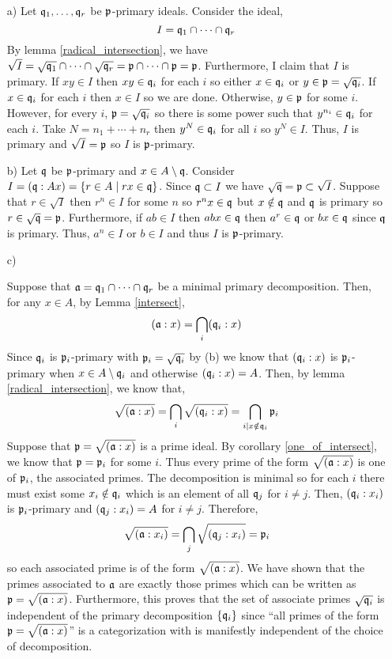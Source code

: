 \documentclass[12pt]{extarticle}
\begin{document}
\begin{enumerate}
\item[a)]
Let $\mathfrak{q}_1, \dots, \mathfrak{q}_r$ be $\mathfrak{p}$-primary ideals. Consider the ideal,
\[ I = \mathfrak{q}_1 \cap \cdots \cap \mathfrak{q}_r \]
By lemma \ref{radical_intersection}, we have $\sqrt{I} = \sqrt{\mathfrak{q}_1} \cap \cdots \cap \sqrt{\mathfrak{q}_r} = \mathfrak{p} \cap \cdots \cap \mathfrak{p} = \mathfrak{p}$. Furthermore, I claim that $I$ is primary. If $xy \in I$ then $xy \in \mathfrak{q}_i$ for each $i$ so either $x \in \mathfrak{q}_i$ or $y \in \mathfrak{p} = \sqrt{\mathfrak{q}_i}$. If $x \in \mathfrak{q}_i$ for each $i$ then $x \in I$ so we are done. Otherwise, $y \in \mathfrak{p}$ for some $i$. However, for every $i$, $\mathfrak{p} = \sqrt{\mathfrak{q}_i}$ so there is some power such that $y^{n_i} \in \mathfrak{q}_i$ for each $i$. Take $N = n_1 + \cdots + n_r$ then $y^{N} \in \mathfrak{q}_i$ for all $i$ so $y^{N} \in I$. Thus, $I$ is primary and $\sqrt{I} = \mathfrak{p}$ so $I$ is $\mathfrak{p}$-primary.
\item[b)]
Let $\mathfrak{q}$ be $\mathfrak{p}$-primary and $x \in A \setminus \mathfrak{q}$. Consider $I = (\mathfrak{q} : Ax) = \{r \in A \mid rx \in \mathfrak{q} \}$. Since $\mathfrak{q} \subset I$ we have $\sqrt{\mathfrak{q}} = \mathfrak{p} \subset \sqrt{I}$. Suppose that $r \in \sqrt{I}$ then $r^n \in I$ for some $n$ so $r^n x \in \mathfrak{q}$ but $x \notin \mathfrak{q}$ and $\mathfrak{q}$ is primary so $r \in \sqrt{\mathfrak{q}} = \mathfrak{p}$. Furthermore, if $ab \in I$ then $abx \in \mathfrak{q}$ then $a^r \in \mathfrak{q}$ or $bx \in \mathfrak{q}$ since $\mathfrak{q}$ is primary. Thus, $a^n \in I$ or $b \in I$ and thus $I$ is $\mathfrak{p}$-primary.

\item[c)]

Suppose that $\mathfrak{a} = \mathfrak{q}_1 \cap \cdots \cap \mathfrak{q}_r$ be a minimal primary decomposition. Then, for any $x \in A$, by Lemma \ref{intersect},
\[ (\mathfrak{a} : x) = \bigcap_i (\mathfrak{q}_i : x) \]
Since $\mathfrak{q}_i$ is $\mathfrak{p}_i$-primary with $\mathfrak{p}_i = \sqrt{\mathfrak{q}_i}$ by (b) we know that $(\mathfrak{q}_i : x)$ is $\mathfrak{p}_i$-primary when $x \in A \setminus \mathfrak{q}_i$ and otherwise $(\mathfrak{q}_i : x) = A$. Then, by lemma \ref{radical_intersection}, we know that,
\[ \sqrt{(\mathfrak{a} : x)} = \bigcap_i \sqrt{(\mathfrak{q}_i : x)} = \bigcap_{i \mid x \notin \mathfrak{q}_i} \mathfrak{p}_i \]
Suppose that $\mathfrak{p} = \sqrt{(\mathfrak{a} : x)}$ is a prime ideal. By corollary \ref{one_of_intersect}, we know that $\mathfrak{p} = \mathfrak{p}_i$ for some $i$. Thus every prime of the form $\sqrt{(\mathfrak{a} : x)}$ is one of $\mathfrak{p}_i$, the associated primes. The decomposition is minimal so for each $i$ there must exist some $x_i \notin \mathfrak{q}_i$ which is an element of all $\mathfrak{q}_j$ for $i \neq j$. Then, $(\mathfrak{q}_i : x_i)$ is $\mathfrak{p}_i$-primary and $(\mathfrak{q}_j : x_i) = A$ for $i \neq j$. Therefore,
\[ \sqrt{(\mathfrak{a} : x_i)} = \bigcap_j \sqrt{(\mathfrak{q}_j : x_i)} = \mathfrak{p}_i \]
so each associated prime is of the form $\sqrt{(\mathfrak{a} : x)}$. We have shown that the primes associated to $\mathfrak{a}$ are exactly those primes which can be written as $\mathfrak{p} = \sqrt{(\mathfrak{a} : x)}$. Furthermore, this proves that the set of associate primes $\sqrt{\mathfrak{q}_i}$ is independent of the primary decomposition $\{ \mathfrak{q}_i \}$ since ``all primes of the form $\mathfrak{p} = \sqrt{(\mathfrak{a} : x)}$'' is a categorization with is manifestly independent of the choice of decomposition.   


\end{enumerate}
\end{document}
